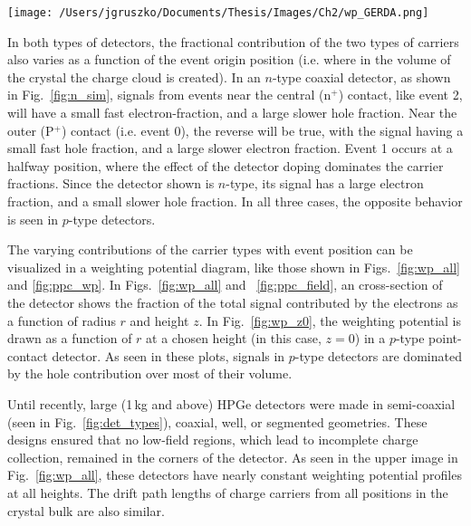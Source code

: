 \begin{SCfigure}[]
 \texttt{[image: /Users/jgruszko/Documents/Thesis/Images/Ch2/wp\_GERDA.png]}
 \caption[Weighting potential maps of a coaxial and BEGe-type detector]{Cross section of a $p$-type semi-coaxial detector \textit{(top)} and a $p$-type BEGe-style point contact detector \textit{(bottom)}. The p$^+$ contact is drawn in grey, with the n$^+$ contact in black. The gap between the contacts is an insulating passivated groove. The BEGe is shown with a charge sensitive amplifier like the LMFEs used to read out the \MJ\ detectors. Image from \cite{Agostini2013}.} 
 \label{fig:wp_all}
\end{SCfigure}

In both types of detectors, the fractional contribution of the two types of carriers also varies as a function of the event origin position (i.e. where in the volume of the crystal the charge cloud is created). In an $n$-type coaxial detector, as shown in Fig.~\ref{fig:n_sim}, signals from events near the central (n$^+$) contact, like event 2, will have a small fast electron-fraction, and a large slower hole fraction. Near the outer (P$^+$) contact (i.e. event 0), the reverse will be true, with the signal having a small fast hole fraction, and a large slower electron fraction. Event 1 occurs at a halfway position, where the effect of the detector doping dominates the carrier fractions. Since the detector shown is $n$-type, its signal has a large electron fraction, and a small slower hole fraction. In all three cases, the opposite behavior is seen in $p$-type detectors. 

The varying contributions of the carrier types with event position can be visualized in a weighting potential diagram, like those shown in Figs.~\ref{fig:wp_all} and \ref{fig:ppc_wp}. In Figs.~\ref{fig:wp_all} and ~\ref{fig:ppc_field}, an cross-section of the detector shows the fraction of the total signal contributed by the electrons as a function of radius $r$ and height $z$. In Fig.~\ref{fig:wp_z0}, the weighting potential is drawn as a function of $r$ at a chosen height (in this case, $z = 0$) in a $p$-type point-contact detector. As seen in these plots, signals in $p$-type detectors are dominated by the hole contribution over most of their volume. 

Until recently, large (1\,kg and above) HPGe detectors were made in semi-coaxial (seen in Fig.~\ref{fig:det_types}), coaxial, well, or segmented geometries. These designs ensured that no low-field regions, which lead to incomplete charge collection, remained in the corners of the detector. As seen in the upper image in Fig.~\ref{fig:wp_all}, these detectors have nearly constant weighting potential profiles at all heights. The drift path lengths of charge carriers from all positions in the crystal bulk are also similar. 

